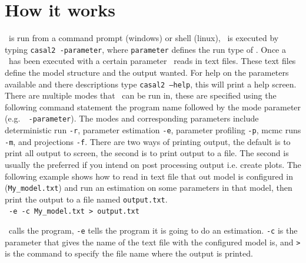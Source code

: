 \section{How it works}\label{sec:intro}

\CNAME\ is run from a command prompt (windows) or shell (linux), \CNAME\ is executed by typing \texttt{casal2 -parameter}, where \texttt{parameter} defines the run type of \CNAME. Once a \CNAME\ has been executed with a certain parameter \CNAME\ reads in text files. These text files define the model structure and the output wanted. For help on the parameters available and there descriptions type \texttt{casal2 --help}, this will print a help screen. There are multiple modes that \CNAME\ can be run in, these are specified using the following command statement the program name followed by the mode parameter (e.g.\CNAME\ \texttt{ -parameter}). The modes and corresponding parameters include deterministic run \texttt{-r}, parameter estimation \texttt{-e}, parameter profiling \texttt{-p}, mcmc runs \texttt{-m}, and projections \texttt{-f}. There are two ways of printing output, the default is to print all output to screen, the second is to print output to a file. The second is usually the preferred if you intend on post processing output i.e. create plots. The following example shows how to read in text file that out model is configured in (\texttt{My\_model.txt}) and run an estimation on some parameters in that model, then print the output to a file named \texttt{output.txt}.\\
\CNAME\ \texttt{-e  -c My\_model.txt > output.txt}

\CNAME\ calls the program, \texttt{-e} tells the program it is going to do an estimation. \texttt{-c} is the parameter that gives the name of the text file with the configured model is, and \texttt{>} is the command to specify the file name where the output is printed.
